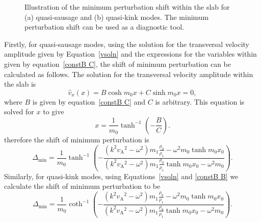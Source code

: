 \documentclass[namedreferences]{solarphysics}
\numberwithin{equation}{section}
\begin{document}
\begin{article}
\begin{figure}
{{{
}}}

\caption{Illustration of the minimum perturbation shift within the slab for (a) quasi-sausage and (b) quasi-kink modes. The minimum perturbation shift can be used as a diagnostic tool.}
\end{figure}

Firstly, for quasi-sausage modes, using the solution for the transversal velocity amplitude given by Equation~\eqref{vsoln} and the expressions for the variables within given by equation~\eqref{constB C}, the shift of minimum perturbation can be calculated as follows. The solution for the transversal velocity amplitude within the slab is
\begin{equation}
\widehat{v}_x(x) = B\cosh{m_0x}+C\sinh{m_0x} = 0,
\end{equation}
where $B$ is given by equation~\eqref{constB C} and $C$ is arbitrary. This equation is solved for $x$ to give
\begin{equation}
x = \frac{1}{m_0} \tanh^{-1}\left(-\frac{B}{C}\right). \label{disp of min power saus}
\end{equation}
therefore the shift of minimum perturbation is
\begin{equation}
\Delta_\textrm{min} = \frac{1}{m_0}\tanh^{-1}\left(-\frac{(k^2{v_\textrm{A}}^2-\omega^2)m_1\frac{\rho_0}{\rho_1} - \omega^2{m_0}\tanh{m_0x_0}}{(k^2{v_\textrm{A}}^2-\omega^2)m_1\frac{\rho_0}{\rho_1}\tanh{m_0x_0} - \omega^2{m_0}}\right). \label{shift min saus}
\end{equation}
Similarly, for quasi-kink modes, using Equations~\eqref{vsoln} and \eqref{constB B} we calculate the shift of minimum perturbation to be
\begin{equation}
\Delta_\textrm{min} = \frac{1}{m_0}\coth^{-1}\left(-\frac{(k^2{v_\textrm{A}}^2-\omega^2)m_1\frac{\rho_0}{\rho_1} - \omega^2{m_0}\tanh{m_0x_0}}{(k^2{v_\textrm{A}}^2-\omega^2)m_1\frac{\rho_0}{\rho_1}\tanh{m_0x_0} - \omega^2{m_0}}\right). \label{shift min kink}
\end{equation}


\end{article}
\end{document}
